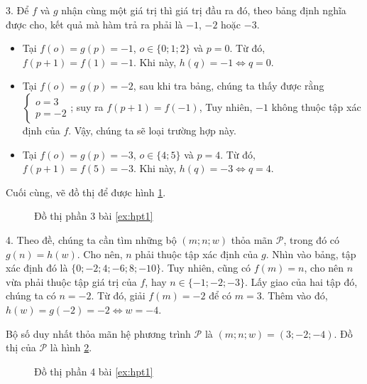 3. Để $f$ và $g$ nhận cùng một giá trị thì giá trị đầu ra đó, theo bảng định nghĩa được cho, kết quả mà hàm trả ra phải là $-1$, $-2$ hoặc $-3$.
\begin{itemize}
   \item Tại $f(o) = g(p) = -1$, $o \in \{0; 1; 2\}$ và $p = 0$. Từ đó, $f(p + 1) = f(1) = -1$. Khi này, $h(q) = -1 \iff q = 0$.
   \item Tại $f(o) = g(p) = -2$, sau khi tra bảng, chúng ta thấy được rằng $\begin{cases}o = 3\\p = -2\end{cases}$; suy ra $f(p + 1) = f(-1)$, Tuy nhiên, $-1$ không thuộc tập xác định của $f$. Vậy, chúng ta sẽ loại trường hợp này.
   \item Tại $f(o) = g(p) = -3$, $o \in \{4; 5\}$ và $p = 4$. Từ đó, $f(p + 1) = f(5) = -3$. Khi này, $h(q) = -3 \iff q = 4$.
\end{itemize}
Cuối cùng, vẽ đồ thị để được hình \ref{fig:hpt13}.

\begin{figure}[H]
   \centering
   \caption{Đồ thị phần 3 bài \ref{ex:hpt1}}
   \label{fig:hpt13}
\end{figure}

4. Theo đề, chúng ta cần tìm những bộ $(m;n;w)$ thỏa mãn $\mathcal{P}$, trong đó có $g(n) = h(w)$. Cho nên, $n$ phải thuộc tập xác định của $g$. Nhìn vào bảng, tập xác định đó là $\{0; -2; 4; -6; 8; -10\}$. Tuy nhiên, cũng có $f(m) = n$, cho nên $n$ vừa phải thuộc tập giá trị của $f$, hay $n \in \{-1; -2; -3\}$. Lấy giao của hai tập đó, chúng ta có $n = -2$. Từ đó, giải $f(m) = -2$ để có $m = 3$. Thêm vào đó, $h(w) = g(-2) = -2 \iff w = -4$.

Bộ số duy nhất thỏa mãn hệ phương trình $\mathcal{P}$ là $\left(m; n; w\right) = \left(3; -2; -4\right)$. Đồ thị của $\mathcal{P}$ là hình \ref{fig:hpt14}.

\begin{figure}[H]
   \centering
   \caption{Đồ thị phần 4 bài \ref{ex:hpt1}}
   \label{fig:hpt14}
\end{figure}